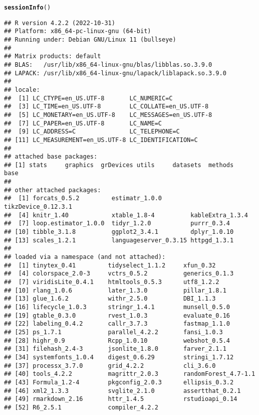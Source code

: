 \documentclass[12pt]{article}\usepackage[]{graphicx}\usepackage[]{xcolor}
\makeatletter
\newcommand{\hlstd}[1]{\textcolor[rgb]{0.345,0.345,0.345}{#1}}%
\newcommand{\hlkwd}[1]{\textcolor[rgb]{0.737,0.353,0.396}{\textbf{#1}}}%
\newenvironment{kframe}{%
 \def\at@end@of@kframe{}%
 \ifinner\ifhmode%
  \def\at@end@of@kframe{\end{minipage}}%
  \begin{minipage}{\columnwidth}%
 \fi\fi%
 \def\FrameCommand##1{\hskip\@totalleftmargin \hskip-\fboxsep
 \colorbox{shadecolor}{##1}\hskip-\fboxsep
     \hskip-\linewidth \hskip-\@totalleftmargin \hskip\columnwidth}%
 \MakeFramed {\advance\hsize-\width
   \@totalleftmargin\z@ \linewidth\hsize
   \@setminipage}}%
 {\par\unskip\endMakeFramed%
 \at@end@of@kframe}
\newenvironment{knitrout}{}{} %
\makeatother
\begin{document}
\begin{knitrout}
\color{fgcolor}\begin{kframe}
\begin{alltt}
\hlkwd{sessionInfo}\hlstd{()}
\end{alltt}
\begin{verbatim}
## R version 4.2.2 (2022-10-31)
## Platform: x86_64-pc-linux-gnu (64-bit)
## Running under: Debian GNU/Linux 11 (bullseye)
## 
## Matrix products: default
## BLAS:   /usr/lib/x86_64-linux-gnu/blas/libblas.so.3.9.0
## LAPACK: /usr/lib/x86_64-linux-gnu/lapack/liblapack.so.3.9.0
## 
## locale:
##  [1] LC_CTYPE=en_US.UTF-8       LC_NUMERIC=C              
##  [3] LC_TIME=en_US.UTF-8        LC_COLLATE=en_US.UTF-8    
##  [5] LC_MONETARY=en_US.UTF-8    LC_MESSAGES=en_US.UTF-8   
##  [7] LC_PAPER=en_US.UTF-8       LC_NAME=C                 
##  [9] LC_ADDRESS=C               LC_TELEPHONE=C            
## [11] LC_MEASUREMENT=en_US.UTF-8 LC_IDENTIFICATION=C       
## 
## attached base packages:
## [1] stats     graphics  grDevices utils     datasets  methods   base     
## 
## other attached packages:
##  [1] forcats_0.5.2         estimatr_1.0.0        tikzDevice_0.12.3.1  
##  [4] knitr_1.40            xtable_1.8-4          kableExtra_1.3.4     
##  [7] loop.estimator_1.0.0  tidyr_1.2.0           purrr_0.3.4          
## [10] tibble_3.1.8          ggplot2_3.4.1         dplyr_1.0.10         
## [13] scales_1.2.1          languageserver_0.3.15 httpgd_1.3.1         
## 
## loaded via a namespace (and not attached):
##  [1] tinytex_0.41         tidyselect_1.1.2     xfun_0.32           
##  [4] colorspace_2.0-3     vctrs_0.5.2          generics_0.1.3      
##  [7] viridisLite_0.4.1    htmltools_0.5.3      utf8_1.2.2          
## [10] rlang_1.0.6          later_1.3.0          pillar_1.8.1        
## [13] glue_1.6.2           withr_2.5.0          DBI_1.1.3           
## [16] lifecycle_1.0.3      stringr_1.4.1        munsell_0.5.0       
## [19] gtable_0.3.0         rvest_1.0.3          evaluate_0.16       
## [22] labeling_0.4.2       callr_3.7.3          fastmap_1.1.0       
## [25] ps_1.7.1             parallel_4.2.2       fansi_1.0.3         
## [28] highr_0.9            Rcpp_1.0.10          webshot_0.5.4       
## [31] filehash_2.4-3       jsonlite_1.8.0       farver_2.1.1        
## [34] systemfonts_1.0.4    digest_0.6.29        stringi_1.7.12      
## [37] processx_3.7.0       grid_4.2.2           cli_3.6.0           
## [40] tools_4.2.2          magrittr_2.0.3       randomForest_4.7-1.1
## [43] Formula_1.2-4        pkgconfig_2.0.3      ellipsis_0.3.2      
## [46] xml2_1.3.3           svglite_2.1.0        assertthat_0.2.1    
## [49] rmarkdown_2.16       httr_1.4.5           rstudioapi_0.14     
## [52] R6_2.5.1             compiler_4.2.2
\end{verbatim}
\end{kframe}
\end{knitrout}
\end{document}
